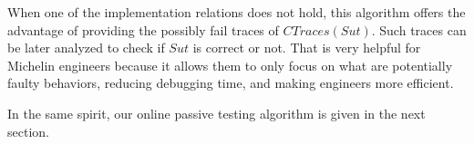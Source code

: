 When one of the implementation relations does not hold, this
algorithm offers the advantage of providing the possibly fail
traces of $CTraces({Sut})$. Such traces can be later analyzed to
check if $\mathit{Sut}$ is correct or not. That is very helpful
for Michelin engineers because it allows them to only focus on
what are potentially faulty behaviors, reducing debugging time,
and making engineers more efficient.

In the same spirit, our online passive testing algorithm is given
in the next section.

\clearpage
